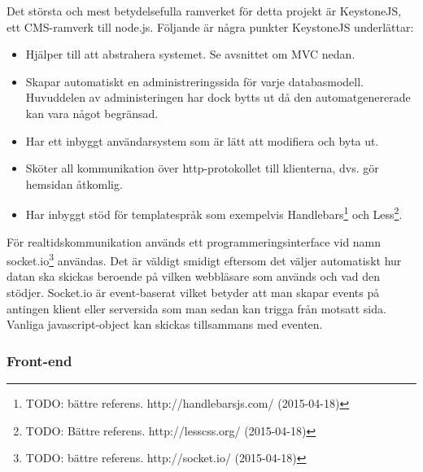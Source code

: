 Det största och mest betydelsefulla ramverket för detta projekt är KeystoneJS, ett CMS-ramverk till node.js.
Följande är några punkter KeystoneJS underlättar:
\begin{itemize}
  \item Hjälper till att abstrahera systemet. Se avsnittet om MVC nedan.
  \item Skapar automatiskt en administreringssida för varje databasmodell.
    Huvuddelen av administeringen har dock bytts ut då den automatgenererade kan vara något begränsad.
  \item Har ett inbyggt användarsystem som är lätt att modifiera och byta ut.
  \item Sköter all kommunikation över http-protokollet till klienterna, dvs. gör hemsidan åtkomlig.
  \item Har inbyggt stöd för templatespråk som exempelvis Handlebars\footnote{TODO: bättre referens. http://handlebarsjs.com/ (2015-04-18)} och Less\footnote{TODO: Bättre referens. http://lesscss.org/ (2015-04-18)}.
\end{itemize}

För realtidskommunikation används ett programmeringsinterface vid namn socket.io\footnote{TODO: bättre referens. http://socket.io/ (2015-04-18)} användas.
Det är väldigt smidigt eftersom det väljer automatiskt hur datan ska skickas beroende på vilken webbläsare som används och vad den stödjer.
Socket.io är event-baserat vilket betyder att man skapar events på antingen klient eller serversida som man sedan kan trigga från motsatt sida.
Vanliga javascript-object kan skickas tillsammans med eventen.

\subsubsection{Front-end}




